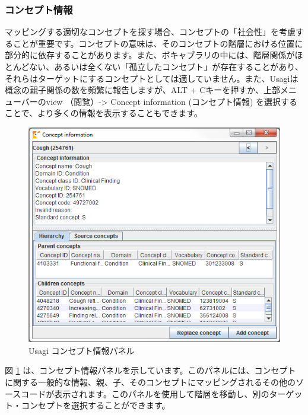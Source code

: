 \documentclass[
  11pt]{book}
\theoremstyle{definition}
\theoremstyle{definition}
\theoremstyle{definition}
\theoremstyle{definition}
\theoremstyle{remark}
\begin{document}
\subsubsection*{コンセプト情報}\label{ux30b3ux30f3ux30bbux30d7ux30c8ux60c5ux5831}

マッピングする適切なコンセプトを探す場合、コンセプトの「社会性」を考慮することが重要です。コンセプトの意味は、そのコンセプトの階層における位置に部分的に依存することがあります。また、ボキャブラリの中には、階層関係がほとんどない、あるいは全くない「孤立したコンセプト」が存在することがあり、それらはターゲットにするコンセプトとしては適していません。また、Usagiは概念の親子関係の数を頻繁に報告しますが、ALT + Cキーを押すか、上部メニューバーのview （閲覧）-\textgreater{} Concept information (コンセプト情報) を選択することで、より多くの情報を表示することもできます。

\begin{figure}

{\centering \includegraphics[width=1\linewidth]{images/ExtractTransformLoad/usagiConceptInfo} 

}

\caption{Usagi コンセプト情報パネル}\label{fig:usagiConceptInfo}
\end{figure}

図 \ref{fig:usagiConceptInfo} は、コンセプト情報パネルを示しています。このパネルには、コンセプトに関する一般的な情報、親、子、そのコンセプトにマッピングされるその他のソースコードが表示されます。このパネルを使用して階層を移動し、別のターゲット・コンセプトを選択することができます。
\end{document}
